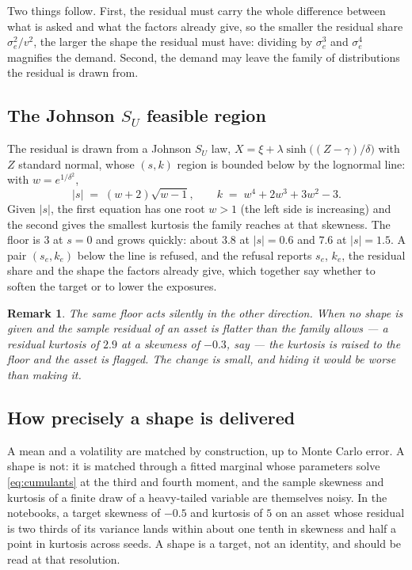 \documentclass[11pt]{article}
\newtheorem{remark}{Remark}
\begin{document}
Two things follow. First, the residual must carry the whole difference between
what is asked and what the factors already give, so the smaller the residual
share $\sigma_e^2/v^2$, the larger the shape the residual must have: dividing
by $\sigma_e^3$ and $\sigma_e^4$ magnifies the demand. Second, the demand may
leave the family of distributions the residual is drawn from.

\subsection{The Johnson $S_U$ feasible region}

The residual is drawn from a Johnson $S_U$ law,
$X = \xi + \lambda \sinh\!\big((Z - \gamma)/\delta\big)$ with $Z$ standard
normal, whose $(s, k)$ region is bounded below by the lognormal line: with
$w = e^{1/\delta^2}$,
\begin{equation}\label{eq:jsu_boundary}
  |s| \;=\; (w + 2)\sqrt{w - 1}, \qquad
  k \;=\; w^4 + 2w^3 + 3w^2 - 3 .
\end{equation}
Given $|s|$, the first equation has one root $w > 1$ (the left side is
increasing) and the second gives the smallest kurtosis the family reaches at
that skewness. The floor is $3$ at $s = 0$ and grows quickly: about $3.8$ at
$|s| = 0.6$ and $7.6$ at $|s| = 1.5$. A pair $(s_e, k_e)$ below the line is
refused, and the refusal reports $s_e$, $k_e$, the residual share and the shape
the factors already give, which together say whether to soften the target or to
lower the exposures.

\begin{remark}
The same floor acts silently in the other direction. When no shape is given and
the sample residual of an asset is flatter than the family allows --- a residual
kurtosis of $2.9$ at a skewness of $-0.3$, say --- the kurtosis is raised to the
floor and the asset is flagged. The change is small, and hiding it would be
worse than making it.
\end{remark}

\subsection{How precisely a shape is delivered}

A mean and a volatility are matched by construction, up to Monte Carlo error. A
shape is not: it is matched through a fitted marginal whose parameters solve
\eqref{eq:cumulants} at the third and fourth moment, and the sample skewness
and kurtosis of a finite draw of a heavy-tailed variable are themselves noisy.
In the notebooks, a target skewness of $-0.5$ and kurtosis of $5$ on an asset
whose residual is two thirds of its variance lands within about one tenth in
skewness and half a point in kurtosis across seeds. A shape is a target, not an
identity, and should be read at that resolution.
\end{document}
